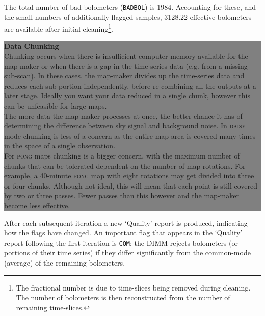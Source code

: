 \documentclass[twoside,11pt]{article}
\newenvironment{latexonly}{}{}
\renewcommand{\_}{\texttt{\symbol{95}}}
\newcommand{\model}[1]{\texttt{#1}}
\begin{document}
The total number of bad bolometers (\texttt{BADBOL}) is 1984.
Accounting for these, and the small numbers of additionally flagged
samples, 3128.22 effective bolometers are available after initial
cleaning\footnote{The fractional number is due to time-slices being
removed during cleaning. The number of bolometers is then
reconstructed from the number of remaining time-slices.}.

\begin{latexonly}
\colorbox{gray}{
\label{page:text}
\hspace{0.1cm}
\begin{minipage}[t]{0.93\linewidth}
\vspace{0.2cm}

\textbf{Data Chunking}\\
Chunking occurs when there is insufficient computer memory available
for the map-maker or when there is a gap in the time-series data (e.g.
from a missing sub-scan). In these cases, the map-maker divides up the
time-series data and reduces each sub-portion independently, before
re-combining all the outputs at a later stage. Ideally you want your
data reduced in a single chunk, however this can be unfeasible for
large maps.
\vspace{0.2cm}\\
The more data the map-maker processes at once, the better chance it
has of determining the difference between sky signal and background
noise. In \textsc{daisy} mode chunking is less of a concern as
the entire map area is covered many times in the space of a single
observation.
\vspace{0.2cm}\\
For \textsc{pong} maps chunking is a bigger concern, with the
maximum number of chunks that can be tolerated dependent on the number
of map rotations. For example, a 40-minute \textsc{pong} map with eight
rotations may get divided into three or four chunks. Although not
ideal, this will mean that each point is still covered by two or three
passes. Fewer passes than this however and the map-maker become less
effective.
\vspace{0.2cm}
\end{minipage}
\hspace{0.1cm}
}
\newline\newline
\end{latexonly}

After each subsequent iteration a new `Quality' report is produced,
indicating how the flags have changed. An important flag that appears
in the `Quality' report following the first iteration is \model{COM}:
the DIMM rejects bolometers (or portions of their time series) if they
differ significantly from the common-mode (average) of the remaining
bolometers.
\end{document}
